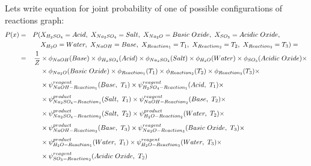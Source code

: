 \documentclass[10pt]{article}
\begin{document}
\begin{tcolorbox}[colback=gray!5,colframe=gray!70,title=Example of factorized chemical reactions graph,left=7pt, right=7pt]
Lets write equation for joint probability of one of possible configurations of reactions graph:
\begin{equation*}
\begin{aligned}
        P(x) & = & P( & X_{H_2SO_4} = Acid,\ X_{Na_2SO_4} = Salt,\ X_{Na_2O} = Basic\ Oxide,\ X_{SO_3} = Acidic\ Oxide, \\
                &    &     & X_{H_2O} = Water,\ X_{NaOH} = Base,\ X_{Reaction_1} = T_1,\ X_{Reaction_2} = T_2,\ X_{Reaction_3} = T_3) = \\
                & = & {1 \over Z} & \times \phi_{NaOH}(Base) \times \phi_{H_2SO_4}(Acid) \times \phi_{Na_2SO_4}(Salt) \times \phi_{H_2O}(Water) \times \phi_{SO_3}(Acidic\ Oxide) \times \\ 
                &    &                   & \times \phi_{Na_2O}(Basic\ Oxide) \times \phi_{Reaction_1}(T_1) \times \phi_{Reaction_2}(T_2) \times \phi_{Reaction_3}(T_3) \times \\[4pt]
                &    &                   & \times \psi^{reagent}_{NaOH-Reaction_1}(Base,\ T_1) \times \psi^{reagent}_{H_2SO_4-Reaction_1}(Acid,\ T_1) \times  \\[4pt]
                &    &                   & \times \psi^{product}_{Na_2SO_4-Reaction_1}(Salt,\ T_1) \times \psi^{reagent}_{NaOH-Reaction_2}(Base,\ T_2) \times \\[4pt]
                &    &                   & \times \psi^{product}_{Na_2SO_4-Reaction_2}(Salt,\ T_2) \times \psi^{product}_{H_2O-Reaction_2}(Water,\ T_2) \times \\[4pt]
                &    &                   & \times \psi^{product}_{NaOH-Reaction_3}(Base,\ T_3) \times \psi^{reagent}_{Na_2O-Reaction_3}(Basic\ Oxide,\ T_3) \times \\[4pt]
                &    &                   & \times \psi^{product}_{H_2O-Reaction_1}(Water,\ T_1) \times \psi^{reagent}_{H_2O-Reaction_3}(Water,\ T_3) \times \\[4pt]
                &    &                   & \times  \psi^{reagent}_{SO_3-Reaction_2}(Acidic\ Oxide,\ T_2) \\
\end{aligned}
\end{equation*}

\end{tcolorbox}

\newpage
\end{document}
